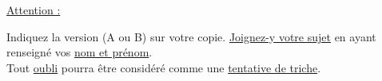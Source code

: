 \documentclass{exam}
\theoremstyle{definition}
\newtheorem{exercice}{Exercice}
\begin{document}
    \begin{tcolorbox}
        \Large
        \begin{center}
            \underline{Attention :}
        \end{center}
        \vspace{-0.5em}
        Indiquez la version (A ou B) sur votre copie. \underline{Joignez-y votre sujet} en ayant renseigné vos \underline{nom et prénom}.\\
        Tout \underline{oubli} pourra être considéré comme une \underline{tentative de triche}.
    \end{tcolorbox}
    
% 
% 
% 
% 
% 
% 
\end{document}
